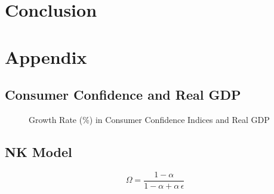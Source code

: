 \documentclass[12pt]{article}
\newcommand{\1}{\mathbbm 1}
\begin{document}
		
		\newpage
		
		\section{Conclusion}
		
		
		
		
		\newpage
		
		
		
		
		
		\section{Appendix}
		
		\subsection{Consumer Confidence and Real GDP}
		
		\begin{figure}[H]
			\centering
			\scalebox{0.8}{}
			\caption[]{Growth Rate (\%) in Consumer Confidence Indices and Real GDP}
		\end{figure}
	
	\subsection{NK Model}
	
	\begin{equation*}
		\Omega = \frac{1-{{\alpha}}}{1-{{\alpha}}+{{\alpha}}\, {{\epsilon}}}
	\end{equation*}
\end{document}
